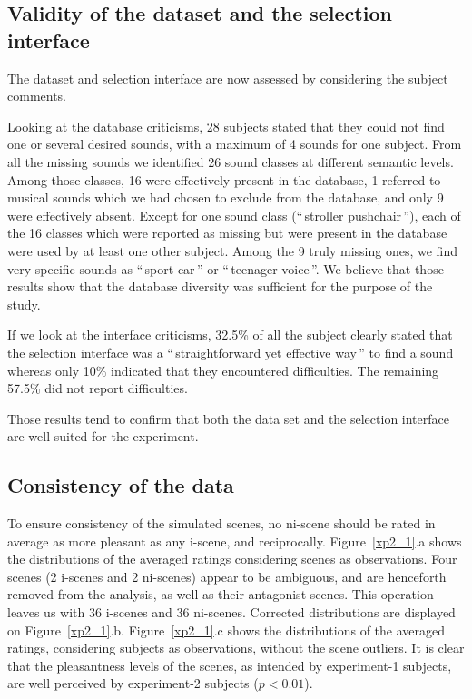 \documentclass[twoside,twocolumn]{article}
\begin{document}
\subsection{Validity of the  dataset and the selection interface}
\label{sec:datasetAnalyses}

The dataset and selection interface are now assessed by considering the subject comments. 

Looking at the database criticisms, 28 subjects stated that they could not find one or several desired sounds, with a maximum of 4 sounds for one subject. From all the missing sounds we identified 26 sound classes at different semantic levels. Among those classes, 16 were effectively present in the database, 1 referred to musical sounds which we had chosen to exclude from the database, and only 9 were effectively absent. Except for one sound class (``\,stroller pushchair\,''), each of the 16 classes which were reported as missing but were present in the database were used by at least one other subject. Among the 9 truly missing ones, we find very specific sounds as ``\,sport car\,'' or ``\,teenager voice\,''. We believe that those results show that the database diversity was sufficient for the purpose of the study. 

If we look at the interface criticisms, 32.5\% of all the subject clearly stated that the selection interface was a ``\,straightforward yet effective way\,'' to find a sound whereas only 10\% indicated that they encountered difficulties. The remaining 57.5\% did not report difficulties. 

Those results tend to confirm that both the data set and the selection interface are well suited for the experiment.

\subsection{Consistency of the data}

To ensure consistency of the simulated scenes, no ni-scene should be rated in average as more pleasant as any i-scene, and reciprocally. Figure~\ref{xp2_1}.a shows the distributions of the averaged ratings considering scenes as observations. Four scenes (2 i-scenes and 2 ni-scenes) appear to be ambiguous, and are henceforth removed from the analysis, as well as their antagonist scenes. This operation leaves us with 36 i-scenes and 36 ni-scenes. Corrected distributions are displayed on Figure~\ref{xp2_1}.b. Figure~\ref{xp2_1}.c shows the distributions of the averaged ratings, considering subjects as observations, without the scene outliers. It is clear that the pleasantness levels of the scenes, as intended by experiment-1 subjects, are well perceived by experiment-2 subjects ($p<0.01$).
\end{document}
